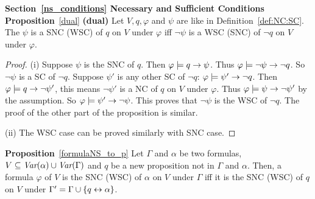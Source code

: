 \documentclass{article}
\begin{document}





 \noindent\textbf{Section~\ref{ns_conditions} Necessary and Sufficient Conditions}\\

 \noindent\textbf{Proposition}~\ref{dual} \textbf{(dual)} Let $V,q,\varphi$ and $\psi$ are like in Definition~\ref{def:NC:SC}.
  The $\psi$ is a SNC (WSC) of $q$ on $V$ under $\varphi$ iff $\neg \psi$ is a WSC (SNC)
     of $\neg q$ on $V$ under $\varphi$.
 \begin{proof}
      (i) Suppose $\psi$ is the SNC of $q$. Then $\varphi \models q \rightarrow \psi$. Thus $\varphi \models \neg \psi \rightarrow \neg q$. So $\neg \psi$ is a
 SC of $\neg q$. Suppose $\psi'$ is any other SC of $\neg q$: $\varphi \models \psi' \rightarrow \neg q$. Then $\varphi \models q \rightarrow \neg \psi'$, this means $\neg \psi'$ is a NC of $q$ on $V$ under $\varphi$.
 Thus $\varphi \models \psi \rightarrow \neg \psi'$ by the assumption. So $\varphi \models \psi' \rightarrow \neg \psi$. This proves that $\neg \psi$ is the WSC of $\neg q$.
 The proof of the other part of the proposition is similar.

 (ii) The WSC case can be proved similarly with SNC case.
     \end{proof}




 \noindent\textbf{Proposition}~\ref{formulaNS_to_p}   Let $\Gamma$ and $\alpha$ be two formulas, $V \subseteq \textit{Var}(\alpha) \cup \textit{Var}(\Gamma)$  and $q$ be a new proposition not in $\Gamma$ and $\alpha$.
  Then, a formula $\varphi$ of $V$ is the SNC (WSC) of $\alpha$ on $V$ under  $\Gamma$ iff it is the SNC (WSC) of $q$ on $V$ under $\Gamma' = \Gamma \cup \{q \leftrightarrow \alpha\}$.
\end{document}
